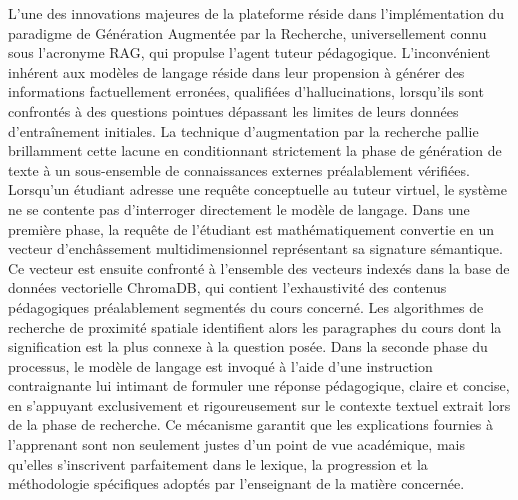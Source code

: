 L'une des innovations majeures de la plateforme réside dans l'implémentation du paradigme de Génération Augmentée par la Recherche, universellement connu sous l'acronyme RAG, qui propulse l'agent tuteur pédagogique. L'inconvénient inhérent aux modèles de langage réside dans leur propension à générer des informations factuellement erronées, qualifiées d'hallucinations, lorsqu'ils sont confrontés à des questions pointues dépassant les limites de leurs données d'entraînement initiales. La technique d'augmentation par la recherche pallie brillamment cette lacune en conditionnant strictement la phase de génération de texte à un sous-ensemble de connaissances externes préalablement vérifiées. Lorsqu'un étudiant adresse une requête conceptuelle au tuteur virtuel, le système ne se contente pas d'interroger directement le modèle de langage. Dans une première phase, la requête de l'étudiant est mathématiquement convertie en un vecteur d'enchâssement multidimensionnel représentant sa signature sémantique. Ce vecteur est ensuite confronté à l'ensemble des vecteurs indexés dans la base de données vectorielle ChromaDB, qui contient l'exhaustivité des contenus pédagogiques préalablement segmentés du cours concerné. Les algorithmes de recherche de proximité spatiale identifient alors les paragraphes du cours dont la signification est la plus connexe à la question posée. Dans la seconde phase du processus, le modèle de langage est invoqué à l'aide d'une instruction contraignante lui intimant de formuler une réponse pédagogique, claire et concise, en s'appuyant exclusivement et rigoureusement sur le contexte textuel extrait lors de la phase de recherche. Ce mécanisme garantit que les explications fournies à l'apprenant sont non seulement justes d'un point de vue académique, mais qu'elles s'inscrivent parfaitement dans le lexique, la progression et la méthodologie spécifiques adoptés par l'enseignant de la matière concernée.

